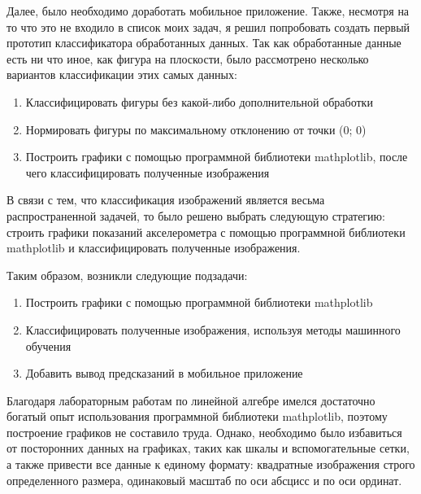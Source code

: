 Далее, было необходимо доработать мобильное приложение. Также, несмотря на то что это не входило в список моих задач, я решил попробовать создать первый прототип классификатора обработанных данных.
Так как обработанные данные есть ни что иное, как фигура на плоскости, было рассмотрено несколько вариантов классификации этих самых данных:
\begin{enumerate}
    \item Классифицировать фигуры без какой-либо дополнительной обработки
    \item Нормировать фигуры по максимальному отклонению от точки (0; 0)
    \item Построить графики с помощью программной библиотеки mathplotlib, после чего классифицировать полученные изображения
\end{enumerate}
В связи с тем, что классификация изображений является весьма распространенной задачей, то было решено выбрать следующую стратегию: строить графики показаний акселерометра с помощью программной библиотеки mathplotlib и классифицировать полученные изображения.

Таким образом, возникли следующие подзадачи:
\begin{enumerate}
    \item Построить графики с помощью программной библиотеки mathplotlib
    \item Классифицировать полученные изображения, используя методы машинного обучения
    \item Добавить вывод предсказаний в мобильное приложение
\end{enumerate}
Благодаря лабораторным работам по линейной алгебре имелся достаточно богатый опыт использования программной библиотеки mathplotlib, поэтому построение графиков не составило труда. Однако, необходимо было избавиться от посторонних данных на графиках, таких как шкалы и вспомогательные сетки, а также привести все данные к единому формату: квадратные изображения строго определенного размера, одинаковый масштаб по оси абсцисс и по оси ординат.

